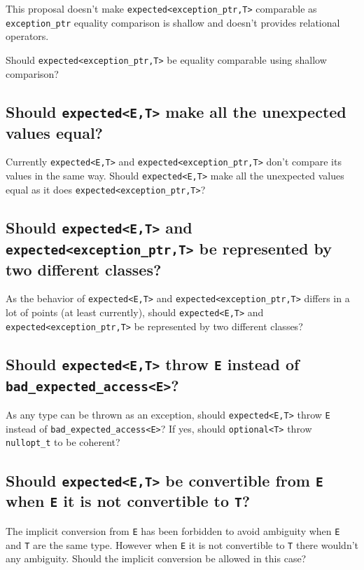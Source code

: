 \documentclass[a4paper,10pt]{article}
\newcommand{\cpp}[1]{\lstinline{#1}}
\begin{document}
This proposal doesn't make \cpp{expected<exception_ptr,T>} comparable as \cpp{exception_ptr} equality comparison is shallow and doesn't provides relational operators.

Should \cpp{expected<exception_ptr,T>} be equality comparable using shallow comparison?

\subsection{Should \cpp{expected<E,T>} make all the unexpected values equal?}

Currently \cpp{expected<E,T>} and \cpp{expected<exception_ptr,T>} don't compare its values in the same way.
Should \cpp{expected<E,T>} make all the unexpected values equal as it does \cpp{expected<exception_ptr,T>}?

\subsection{Should \cpp{expected<E,T>} and \cpp{expected<exception_ptr,T>} be represented by two different classes?}

As the behavior of \cpp{expected<E,T>} and \cpp{expected<exception_ptr,T>} differs in a lot of points (at least currently), should \cpp{expected<E,T>} and \cpp{expected<exception_ptr,T>} be represented by two different classes?

\subsection{Should \cpp{expected<E,T>} throw \cpp{E} instead of \cpp{bad_expected_access<E>}?}

As any type can be thrown as an exception, should \cpp{expected<E,T>} throw \cpp{E} instead of \cpp{bad_expected_access<E>}? 
If yes, should \cpp{optional<T>} throw \cpp{nullopt_t} to be coherent? 

\subsection{Should \cpp{expected<E,T>} be convertible from \cpp{E} when \cpp{E} it is not convertible to \cpp{T}?}

The implicit conversion from \cpp{E} has been forbidden to avoid ambiguity when \cpp{E} and \cpp{T} are the same type. 
However when \cpp{E} it is not convertible to \cpp{T} there wouldn't any ambiguity. 
Should the implicit conversion be allowed in this case?
\end{document}
